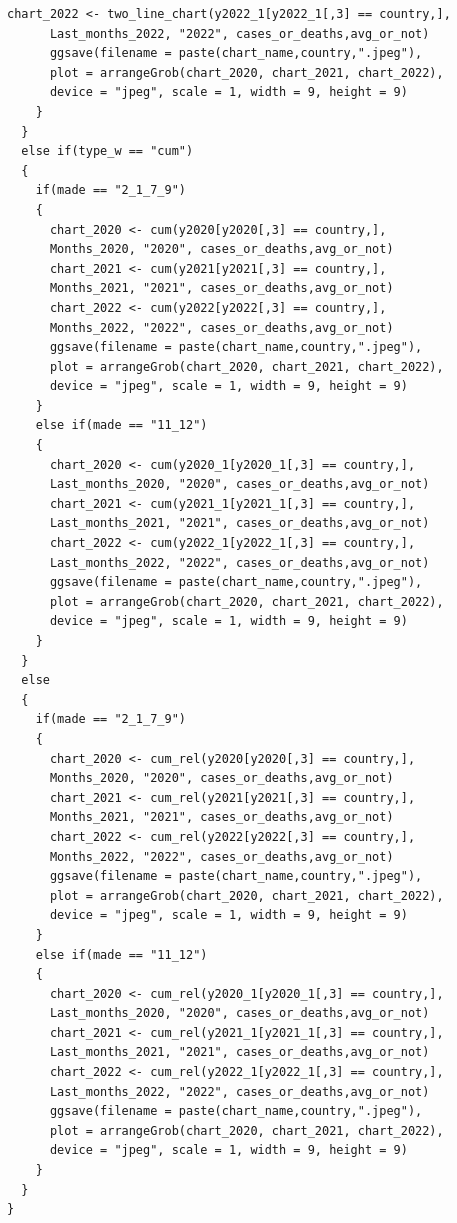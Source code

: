 \documentclass[a4paper]{article}
\theoremstyle{definition}
\begin{document}
\begin{enumerate}[i)]
\begin{lstlisting}[frame = single]
      chart_2022 <- two_line_chart(y2022_1[y2022_1[,3] == country,],
      Last_months_2022, "2022", cases_or_deaths,avg_or_not)
      ggsave(filename = paste(chart_name,country,".jpeg"), 
      plot = arrangeGrob(chart_2020, chart_2021, chart_2022), 
      device = "jpeg", scale = 1, width = 9, height = 9)
    }
  }
  else if(type_w == "cum") 
  {
    if(made == "2_1_7_9")
    {
      chart_2020 <- cum(y2020[y2020[,3] == country,],
      Months_2020, "2020", cases_or_deaths,avg_or_not)
      chart_2021 <- cum(y2021[y2021[,3] == country,], 
      Months_2021, "2021", cases_or_deaths,avg_or_not)
      chart_2022 <- cum(y2022[y2022[,3] == country,], 
      Months_2022, "2022", cases_or_deaths,avg_or_not)
      ggsave(filename = paste(chart_name,country,".jpeg"), 
      plot = arrangeGrob(chart_2020, chart_2021, chart_2022), 
      device = "jpeg", scale = 1, width = 9, height = 9)
    }
    else if(made == "11_12")
    {
      chart_2020 <- cum(y2020_1[y2020_1[,3] == country,], 
      Last_months_2020, "2020", cases_or_deaths,avg_or_not)
      chart_2021 <- cum(y2021_1[y2021_1[,3] == country,], 
      Last_months_2021, "2021", cases_or_deaths,avg_or_not)
      chart_2022 <- cum(y2022_1[y2022_1[,3] == country,], 
      Last_months_2022, "2022", cases_or_deaths,avg_or_not)
      ggsave(filename = paste(chart_name,country,".jpeg"), 
      plot = arrangeGrob(chart_2020, chart_2021, chart_2022), 
      device = "jpeg", scale = 1, width = 9, height = 9)
    }
  }
  else 
  {
    if(made == "2_1_7_9")
    {
      chart_2020 <- cum_rel(y2020[y2020[,3] == country,], 
      Months_2020, "2020", cases_or_deaths,avg_or_not)
      chart_2021 <- cum_rel(y2021[y2021[,3] == country,],
      Months_2021, "2021", cases_or_deaths,avg_or_not)
      chart_2022 <- cum_rel(y2022[y2022[,3] == country,], 
      Months_2022, "2022", cases_or_deaths,avg_or_not)
      ggsave(filename = paste(chart_name,country,".jpeg"), 
      plot = arrangeGrob(chart_2020, chart_2021, chart_2022), 
      device = "jpeg", scale = 1, width = 9, height = 9)
    }
    else if(made == "11_12")
    {
      chart_2020 <- cum_rel(y2020_1[y2020_1[,3] == country,], 
      Last_months_2020, "2020", cases_or_deaths,avg_or_not)
      chart_2021 <- cum_rel(y2021_1[y2021_1[,3] == country,], 
      Last_months_2021, "2021", cases_or_deaths,avg_or_not)
      chart_2022 <- cum_rel(y2022_1[y2022_1[,3] == country,], 
      Last_months_2022, "2022", cases_or_deaths,avg_or_not)
      ggsave(filename = paste(chart_name,country,".jpeg"), 
      plot = arrangeGrob(chart_2020, chart_2021, chart_2022), 
      device = "jpeg", scale = 1, width = 9, height = 9)
    }
  }
}
\end{lstlisting}


\end{enumerate}
\end{document}

